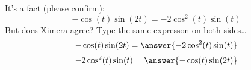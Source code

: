\documentclass{ximera}
\begin{document}
\begin{exercise}
  It's a fact (please confirm):
  \[
  -\cos(t)\sin(2t) = -2\cos^2(t)\sin(t)
  \]
  But does Ximera agree? Type the same expresson on both sides\dots
  \[
  -\cos(t)\sin(2t) = \answer{-2\cos^2(t)\sin(t)}
  \]
  \[
  -2\cos^2(t)\sin(t) = \answer{-\cos(t)\sin(2t)}
  \]
\end{exercise}
\end{document}
